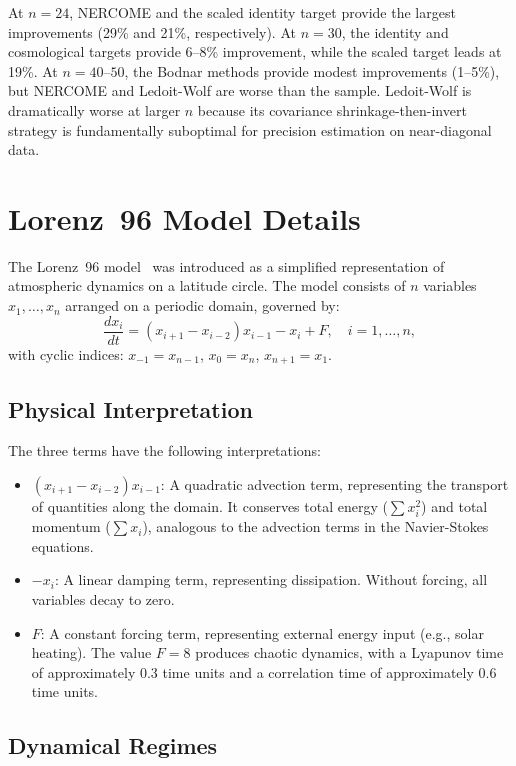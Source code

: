 At $n = 24$, NERCOME and the scaled identity target provide the largest improvements (29\% and 21\%, respectively). At $n = 30$, the identity and cosmological targets provide 6--8\% improvement, while the scaled target leads at 19\%. At $n = 40$--$50$, the Bodnar methods provide modest improvements (1--5\%), but NERCOME and Ledoit-Wolf are worse than the sample. Ledoit-Wolf is dramatically worse at larger $n$ because its covariance shrinkage-then-invert strategy is fundamentally suboptimal for precision estimation on near-diagonal data.

\chapter{Lorenz~96 Model Details}
\label{app:lorenz96}

The Lorenz~96 model~\citep{lorenz1996predictability} was introduced as a simplified representation of atmospheric dynamics on a latitude circle. The model consists of $n$ variables $x_1, \ldots, x_n$ arranged on a periodic domain, governed by:
\begin{equation}
\frac{dx_i}{dt} = (x_{i+1} - x_{i-2})x_{i-1} - x_i + F, \quad i = 1, \ldots, n,
\end{equation}
with cyclic indices: $x_{-1} = x_{n-1}$, $x_0 = x_n$, $x_{n+1} = x_1$.

\section{Physical Interpretation}

The three terms have the following interpretations:
\begin{itemize}
\item $(x_{i+1} - x_{i-2})x_{i-1}$: A quadratic advection term, representing the transport of quantities along the domain. It conserves total energy ($\sum x_i^2$) and total momentum ($\sum x_i$), analogous to the advection terms in the Navier-Stokes equations.
\item $-x_i$: A linear damping term, representing dissipation. Without forcing, all variables decay to zero.
\item $F$: A constant forcing term, representing external energy input (e.g., solar heating). The value $F = 8$ produces chaotic dynamics, with a Lyapunov time of approximately 0.3 time units and a correlation time of approximately 0.6 time units.
\end{itemize}

\section{Dynamical Regimes}

